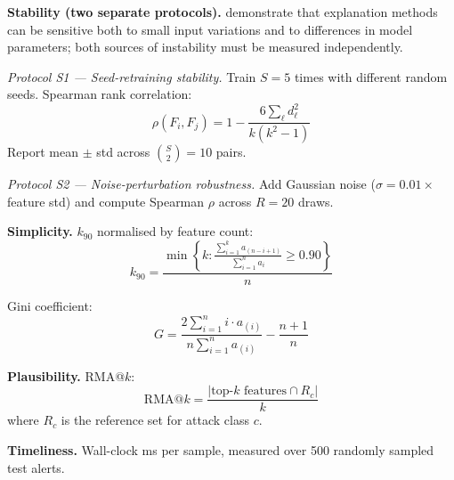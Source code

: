 \documentclass[12pt,a4paper]{report}
\begin{document}
\vspace{1em}
\noindent\textbf{Stability (two separate protocols).} \cite{alvarez2018} demonstrate that explanation methods can be sensitive both to small input variations and to differences in model parameters; both sources of instability must be measured independently.

\noindent\textit{Protocol S1 --- Seed-retraining stability.} Train $S = 5$ times with different random seeds. Spearman rank correlation:
\begin{equation}
\rho(F_i, F_j) = 1 - \frac{6 \sum_\ell d_\ell^2}{k(k^2 - 1)}
\end{equation}
Report mean $\pm$ std across $\binom{S}{2} = 10$ pairs.

\noindent\textit{Protocol S2 --- Noise-perturbation robustness.} Add Gaussian noise ($\sigma = 0.01 \times$ feature std) and compute Spearman $\rho$ across $R = 20$ draws.

\vspace{1em}
\noindent\textbf{Simplicity.} $k_{90}$ normalised by feature count:
\begin{equation}
k_{90} = \frac{\min \left\{ k : \frac{\sum_{i=1}^{k} a_{(n-i+1)}}{\sum_{i=1}^{n} a_i} \geq 0.90 \right\}}{n}
\end{equation}

Gini coefficient:
\begin{equation}
G = \frac{2 \sum_{i=1}^{n} i \cdot a_{(i)}}{n \sum_{i=1}^{n} a_{(i)}} - \frac{n + 1}{n}
\end{equation}

\vspace{1em}
\noindent\textbf{Plausibility.} RMA@$k$:
\begin{equation}
\text{RMA@}k = \frac{|\text{top-}k \text{ features} \cap R_c|}{k}
\end{equation}
where $R_c$ is the reference set for attack class $c$.

\vspace{1em}
\noindent\textbf{Timeliness.} Wall-clock ms per sample, measured over 500 randomly sampled test alerts.

\vspace{1em}
\end{document}
